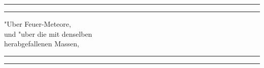\documentclass[a4paper, 11pt, oneside, polutonikogreek, german]{article}
\begin{document}
\swabfamily
\renewcommand{\contentsname}{
\swabfamily{Inhaltsverzeichnis}
}
\let\origcftsecfont\cft
\let\origcftsecpagefont\cftsecpagefont
\let\origcftsecafterpnum\cftsecafterpnum
\renewcommand{\cftsecpagefont}{\swabfamily{\origcftsecpagefont}}
\renewcommand{\cftsecafterpnum}{\swabfamily{\origcftsecafterpnum}}
\let\origcftsubsecpagefont\cftsubsecpagefont
\let\origcftsubsecafterpnum\cftsubsecafterpnum
\renewcommand{\cftsubsecpagefont}{\swabfamily{\origcftsubsecpagefont}}
\renewcommand{\cftsubsecafterpnum}{\swabfamily{\origcftsubsecafterpnum}}
\let\origcftsubsubsecpagefont\cftsubsubsecpagefont
\let\origcftsubsubsecafterpnum\cftsubsubsecafterpnum
\renewcommand{\cftsubsubsecpagefont}{\swabfamily{\origcftsubsubsecpagefont}}
\renewcommand{\cftsubsubsecafterpnum}{\swabfamily{\origcftsubsubsecafterpnum}}
\begin{titlepage} %
	\centering %

	
	\rule{\textwidth}{1.6pt}\vspace*{-\baselineskip}\vspace*{2pt} %
	\rule{\textwidth}{0.4pt} %
	
	\vspace{1\baselineskip} %
	
	{\huge "Uber Feuer-Meteore,\\[1.25pt] und "uber die mit denselben\\[1.25pt] herabgefallenen Massen,\\[1.25pt]}
	
	\vspace{1\baselineskip} %

	\rule{\textwidth}{0.4pt}\vspace*{-\baselineskip}\vspace{3.2pt} %
	\rule{\textwidth}{1.6pt} %
	
	\vspace{1\baselineskip} %
	
	

\end{titlepage}
\end{document}
